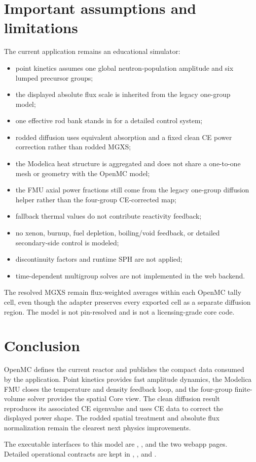 \documentclass[11pt]{article}
\begin{document}
\section{Important assumptions and limitations}

The current application remains an educational simulator:
\begin{itemize}
  \item point kinetics assumes one global neutron-population amplitude and six
        lumped precursor groups;
  \item the displayed absolute flux scale is inherited from the legacy
        one-group model;
  \item one effective rod bank stands in for a detailed control system;
  \item rodded diffusion uses equivalent absorption and a fixed clean CE power
        correction rather than rodded MGXS;
  \item the Modelica heat structure is aggregated and does not share a
        one-to-one mesh or geometry with the OpenMC model;
  \item the FMU axial power fractions still come from the legacy one-group
        diffusion helper rather than the four-group CE-corrected map;
  \item fallback thermal values do not contribute reactivity feedback;
  \item no xenon, burnup, fuel depletion, boiling/void feedback, or detailed
        secondary-side control is modeled;
  \item discontinuity factors and runtime SPH are not applied;
  \item time-dependent multigroup solves are not implemented in the web backend.
\end{itemize}

The resolved MGXS remain flux-weighted averages within each OpenMC tally cell,
even though the adapter preserves every exported cell as a separate diffusion
region.  The model is not pin-resolved and is not a licensing-grade core code.

\section{Conclusion}

OpenMC defines the current reactor and publishes the compact data consumed by
the application.  Point kinetics provides fast amplitude dynamics, the
Modelica FMU closes the temperature and density feedback loop, and the
four-group finite-volume solver provides the spatial Core view.  The clean
diffusion result reproduces its associated CE eigenvalue and uses CE data to
correct the displayed power shape.  The rodded spatial treatment and absolute
flux normalization remain the clearest next physics improvements.

The executable interfaces to this model are
,
, and the two webapp pages.
Detailed operational contracts are kept in
,
, and
.
\end{document}
